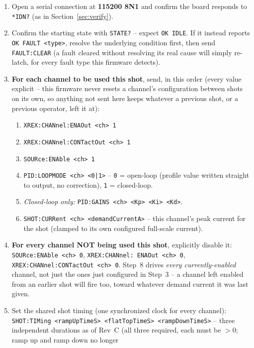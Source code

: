 \documentclass[11pt]{article}
\newcommand{\code}[1]{\texttt{#1}}
\begin{document}
\begin{enumerate}[label=\arabic*.]
  \item Open a serial connection at \textbf{115200 8N1} and confirm the
    board responds to \code{*IDN?} (as in Section~\ref{sec:verify}).
  \item Confirm the starting state with \code{STATE?} -- expect
    \code{OK IDLE}. If it instead reports \code{OK FAULT <type>}, resolve
    the underlying condition first, then send \code{FAULT:CLEAR} (a
    fault cleared without resolving its real cause will simply re-latch,
    for every fault type this firmware detects).
  \item \textbf{For each channel to be used this shot}, send, in this
    order (every value explicit -- this firmware never resets a
    channel's configuration between shots on its own, so anything not
    sent here keeps whatever a previous shot, or a previous operator,
    left it at):
    \begin{enumerate}[label=(\alph*)]
      \item \code{XREX:CHANnel:ENAOut <ch> 1}
      \item \code{XREX:CHANnel:CONTactOut <ch> 1}
      \item \code{SOURce:ENAble <ch> 1}
      \item \code{PID:LOOPMODE <ch> <0|1>} -- \code{0} = open-loop
        (profile value written straight to output, no correction),
        \code{1} = closed-loop.
      \item \emph{Closed-loop only:} \code{PID:GAINS <ch> <Kp> <Ki> <Kd>}.
      \item \code{SHOT:CURRent <ch> <demandCurrentA>} -- this
        channel's peak current for the shot (clamped to its own
        configured full-scale current).
    \end{enumerate}
  \item \textbf{For every channel NOT being used this shot}, explicitly
    disable it: \code{SOURce:ENAble <ch> 0}, \code{XREX:CHANnel:
    ENAOut <ch> 0}, \code{XREX:CHANnel:CONTactOut <ch> 0}. Step~8 drives
    \emph{every currently-enabled} channel, not just the ones just
    configured in Step~3 -- a channel left enabled from an earlier shot
    will fire too, toward whatever demand current it was last given.
  \item Set the shared shot timing (one synchronized clock for every
    channel): \code{SHOT:TIMing <rampUpTimeS> <flatTopTimeS>
    <rampDownTimeS>} -- three independent durations as of Rev~C (all
    three required, each must be $>0$; ramp up and ramp down no longer

\end{enumerate}
\end{document}
